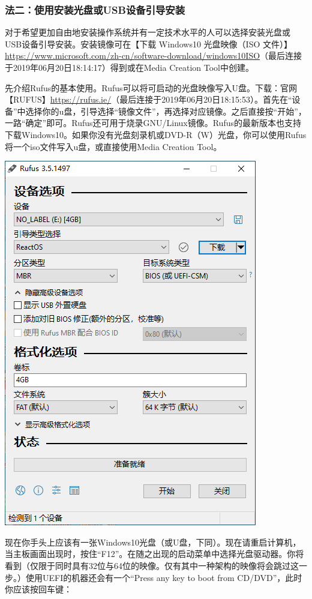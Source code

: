 \subsubsection{法二：使用安装光盘或USB设备引导安装}
对于希望更加自由地安装操作系统并有一定技术水平的人可以选择安装光盘或USB设备引导安装。安装镜像可在【下载 Windows10 光盘映像（ISO 文件）】\url{https://www.microsoft.com/zh-cn/software-download/windows10ISO}（最后连接于2019年06月20日18:14:17）得到或在Media Creation Tool中创建。\par
先介绍Rufus的基本使用。Rufus可以将可启动的光盘映像写入U盘。下载：官网【RUFUS】\url{https://rufus.ie/}（最后连接于2019年06月20日18:15:53）。首先在“设备”中选择你的u盘，引导选择“镜像文件”，再选择对应镜像。之后直接按“开始”，一路“确定”即可。Rufus还可用于烧录GNU/Linux镜像。Rufus的最新版本也支持下载Windows10。如果你没有光盘刻录机或DVD-R（W）光盘，你可以使用Rufus将一个iso文件写入u盘，或直接使用Media Creation Tool。
\begin{center}
	\includegraphics[scale=0.3]{pic/Rufus}	
\end{center} \par
现在你手头上应该有一张Windows10光盘（或U盘，下同）。现在请重启计算机，当主板画面出现时，按住“F12”。在随之出现的启动菜单中选择光盘驱动器。你将看到（仅限于同时具有32位与64位的映像。仅有其中一种架构的映像将会跳过这一步。）使用UEFI的机器还会有一个“Press any key to boot from CD/DVD”，此时你应该按回车键：
